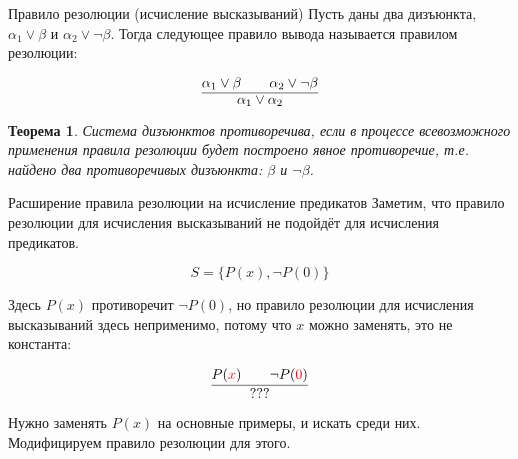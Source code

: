 \documentclass[aspectratio=169]{beamer}
\newtheorem{thm}{Теорема}[section]
\begin{document}
\begin{frame}{Правило резолюции (исчисление высказываний)}
Пусть даны два дизъюнкта, $\alpha_1 \vee \beta$ и $\alpha_2 \vee \neg \beta$.
Тогда следующее правило вывода называется правилом резолюции:

$$\infer{\alpha_1\vee \alpha_2}{\alpha_1\vee \beta\quad\quad \alpha_2\vee\neg \beta}$$

\begin{thm}Система дизъюнктов противоречива, если в процессе всевозможного применения
правила резолюции будет построено явное противоречие,
т.е. найдено два противоречивых дизъюнкта: $\beta$ и $\neg\beta$.
\end{thm}
\end{frame}

\begin{frame}{Расширение правила резолюции на исчисление предикатов}
Заметим, что правило резолюции для исчисления высказываний не подойдёт для исчисления предикатов.

$$S = \{ P(x), \neg P(0)\}$$

Здесь $P(x)$ противоречит $\neg P(0)$, но правило резолюции для исчисления высказываний здесь неприменимо, потому
что $x$ можно заменять, это не константа:

$$\infer{???}{P({\color{red}x})\quad\quad\neg P({\color{red}0})}$$

Нужно заменять $P(x)$ на основные примеры, и искать среди них. Модифицируем правило резолюции для этого.

\end{frame}
\end{document}
